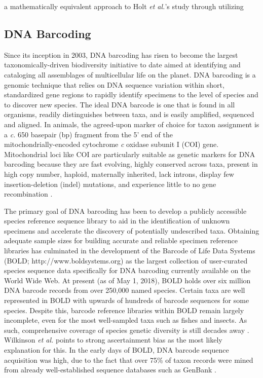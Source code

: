 a mathematically equivalent approach to Holt \textit{et al.}'s \cite{holt2007experimental} study through utilizing


\subsection{DNA Barcoding}

Since its inception in 2003, DNA barcoding \cite{hebert2003biological} has risen to become the largest \\ taxonomically-driven biodiversity initiative to date aimed at identifying and cataloging all assemblages of multicellular life on the planet. DNA barcoding is a genomic technique that relies on DNA sequence variation within short, standardized gene regions to rapidly identify specimens to the level of species and to discover new species. The ideal DNA barcode is one that is found in all organisms, readily distinguishes between taxa, and is easily amplified, sequenced and aligned. In animals, the agreed-upon marker of choice for taxon assignment is a \textit{c.} 650 basepair (bp) fragment from the 5' end of the \\ mitochondrially-encoded cytochrome \textit{c} oxidase subunit I (COI) gene. Mitochondrial loci like COI are particularly suitable as genetic markers for DNA barcoding because they are fast evolving, highly conserved across taxa, present in high copy number, haploid, maternally inherited, lack introns, display few insertion-deletion (indel) mutations, and experience little to no gene recombination \cite{hebert2003biological, hebert2003barcoding}.



The primary goal of DNA barcoding has been to develop a publicly accessible species reference sequence library to aid in the identification of unknown specimens and accelerate the discovery of potentially undescribed taxa. Obtaining adequate sample sizes for building accurate and reliable specimen reference libraries has culminated in the development of the Barcode of Life Data Systems (BOLD; http://www.boldsystems.org) \cite{ratnasingham2007bold} as the largest collection of user-curated species sequence data specifically for DNA barcoding currently available on the World Wide Web. At present (as of May 1, 2018), BOLD holds over six million DNA barcode records from over 250,000 named species. Certain taxa are well represented in BOLD with upwards of hundreds of barcode sequences for some species. Despite this, barcode reference libraries within BOLD remain largely incomplete, even for the most well-sampled taxa such as fishes and insects. As such, comprehensive coverage of species genetic diversity is still decades away \cite{wilkinson2017replacing}. Wilkinson \textit{et al.} \cite{wilkinson2017replacing} points to strong ascertainment bias as the most likely explanation for this. In the early days of BOLD, DNA barcode sequence acquisition was high, due to the fact that over 75\% of taxon records were mined from already well-established sequence databases such as GenBank \cite{wilkinson2017replacing}.


